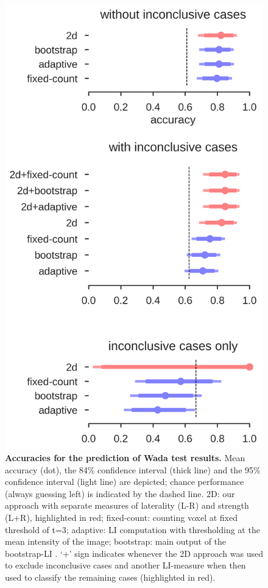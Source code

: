 \documentclass[fleqn,10pt]{SelfArx} %
\begin{document}
\begin{figure}[h]	
	\renewcommand{\familydefault}{\sfdefault}\normalfont
	\centering
	\includegraphics[width=0.8\columnwidth]{../reports/figures/15-wada.png}
	\caption{\textbf{Accuracies for the prediction of Wada test results.} 
		Mean accuracy (dot), the 84\% confidence interval (thick line) and the 95\% confidence interval (light line) are depicted; chance performance (always guessing left) is indicated by the dashed line. 2D: our approach with separate measures of laterality (L-R) and strength (L+R), highlighted in red; fixed-count: counting voxel at fixed threshold of t=3; adaptive: LI computation with thresholding at the mean intensity of the image; bootstrap: main output of the bootstrap-LI \citep{Wilke_2006}. ‘+’ sign indicates whenever the 2D approach was used to exclude inconclusive cases and another LI-measure when then used to classify the remaining cases (highlighted in red).}%
	\label{fig:predwada}
\end{figure}
\end{document}
